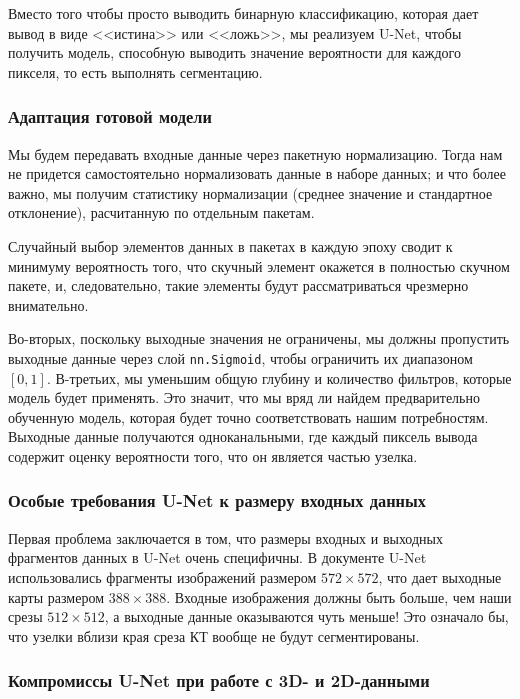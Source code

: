\documentclass[%
	11pt,
	a4paper,
	utf8,
		]{article}
\begin{document}
Вместо того чтобы просто выводить бинарную классификацию, которая дает вывод в виде <<истина>> или <<ложь>>, мы реализуем U-Net, чтобы получить модель, способную выводить значение вероятности для каждого пикселя, то есть выполнять сегментацию.

\subsubsection{Адаптация готовой модели}

Мы будем передавать входные данные через пакетную нормализацию. Тогда нам не придется самостоятельно нормализовать данные в наборе данных; и что более важно, мы получим статистику нормализации (среднее значение и стандартное отклонение), расчитанную по отдельным пакетам. 

Случайный выбор элементов данных в пакетах в каждую эпоху сводит к минимуму вероятность того, что скучный элемент окажется в полностью скучном пакете, и, следовательно, такие элементы будут рассматриваться чрезмерно внимательно.

Во-вторых, поскольку выходные значения не ограничены, мы должны пропустить выходные данные через слой \verb|nn.Sigmoid|, чтобы ограничить их диапазоном $[0, 1]$. В-третьих, мы уменьшим общую глубину и количество фильтров, которые модель будет применять. Это значит, что мы вряд ли найдем предварительно обученную модель, которая будет точно соответствовать нашим потребностям. Выходные данные получаются одноканальными, где каждый пиксель вывода содержит оценку вероятности того, что он является частью узелка.

\subsubsection{Особые требования U-Net к размеру входных данных}

Первая проблема заключается в том, что размеры входных и выходных фрагментов данных в U-Net очень специфичны. В документе U-Net использовались фрагменты изображений размером $572 \times 572$, что дает выходные карты размером $388 \times 388$. Входные изображения должны быть больше, чем наши срезы $512 \times 512$, а выходные данные оказываются чуть меньше! Это означало бы, что узелки вблизи края среза КТ вообще не будут сегментированы.

\subsubsection{Компромиссы U-Net при работе с 3D- и 2D-данными}
\end{document}
